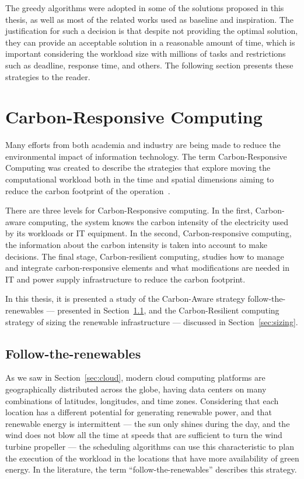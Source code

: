 The greedy algorithms were adopted in some of the solutions proposed in this thesis, as well as most of the related works used as baseline and inspiration. The justification for such a decision is that despite not providing the optimal solution, they can provide an acceptable solution in a reasonable amount of time, which is important considering the workload size with millions of tasks and restrictions such as deadline, response time, and others. The following section presents these strategies to the reader.

\section{Carbon-Responsive Computing}

\label{sec:carbon_responsive}

Many efforts from both academia and industry are being made to reduce the environmental impact of information technology. The term Carbon-Responsive Computing was created to describe the strategies that explore moving the computational workload both in the time and spatial dimensions aiming to reduce the carbon footprint of the operation~\cite{schooler2021carbonaware}.


There are three levels for Carbon-Responsive computing. In the first, Carbon-aware computing, the system knows the carbon intensity of the electricity used by its workloads or IT equipment. In the second, Carbon-responsive computing, the information about the carbon intensity is taken into account to make decisions. The final stage, Carbon-resilient computing, studies how to manage and integrate carbon-responsive elements and what modifications are needed in IT and power supply infrastructure to reduce the carbon footprint.

In this thesis, it is presented a study of the Carbon-Aware strategy follow-the-renewables --- presented in Section~\ref{sec:followtherenewables}, and the Carbon-Resilient computing strategy of sizing the renewable infrastructure --- discussed in Section~\ref{sec:sizing}.

\subsection{Follow-the-renewables}

\label{sec:followtherenewables}

As we saw in Section~\ref{sec:cloud}, modern cloud computing platforms are geographically distributed across the globe, having data centers on many combinations of latitudes, longitudes, and time zones. Considering that each location has a different potential for generating renewable power, and that renewable energy is intermittent --- the sun only shines during the day, and the wind does not blow all the time at speeds that are sufficient to turn the wind turbine propeller --- the scheduling algorithms can use this characteristic to plan the execution of the workload in the locations that have more availability of green energy. In the literature, the term ``follow-the-renewables'' \cite{shuja2016sustainable} describes this strategy. 


